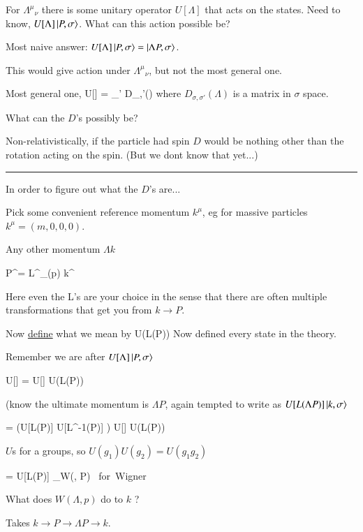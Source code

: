 {For ${\Lambda^\mu}_\nu$ there is some unitary operator $U[\Lambda]$ that acts on the states.
Need to know, $U[\Lambda] \ket{P, \sigma}$.
What can this action possible be?

Most naive answer:  $U[\Lambda] \ket{P, \sigma} = \ket{\Lambda P, \sigma}$.

This would give action under ${\Lambda^\mu}_\nu$, but not the most general one.

Most general one,
\be
U[\Lambda]  = \sum_{\sigma'} D_{\sigma,\sigma'}(\Lambda) 
\ee
where $D_{\sigma,\sigma'}(\Lambda)$ is a matrix in $\sigma$ space.

What can the $D$'s possibly be?

Non-relativistically, if the particle had spin $D$ would be nothing other than the rotation acting on the spin. (But we dont know that yet...)

\noindent\rule{\textwidth}{1pt}

In order to figure out what the $D$'s are...

Pick some convenient reference momentum $k^\mu$,  eg for massive particles $k^\mu = (m,0,0,0)$.

Any other momentum $\Lambda k$

\be
P^\mu = L^\mu_\nu(p) k^\nu
\ee

Here even the L's are your choice in the sense that there are often multiple transformations that get you from $k \rightarrow P$.

Now \underline{define} what we mean by 
\be
{} \equiv U(L(P)) 
\ee
Now defined every state in the theory.

Remember we are after $U[\Lambda] \ket{P, \sigma}$

\be
U[\Lambda]  = U[\Lambda] U(L(P)) 
\ee

(know the ultimate momentum is $\Lambda P$, again tempted to write as $U[L(\Lambda P)] \ket{k, \sigma}$


\be
 = \left(U[L(\Lambda P)] U[L^{-1}(\Lambda P)] \right) U[\Lambda] U(L(P)) 
\ee

$U$s for a groups, so $U(g_1)U(g_2) = U(g_1g_2)$

\be
 = U[L(\Lambda P)] _{W(\Lambda, P) \mbox{ for Wigner}} 
\ee

What does $W(\Lambda,p)$ do to $k$ ?

Takes $k\rightarrow P \rightarrow \Lambda P \rightarrow k$.

}
